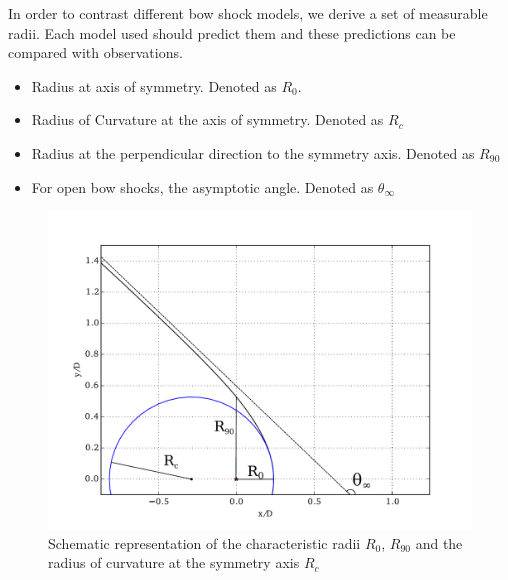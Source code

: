 In order to contrast different bow shock models, we  derive a set of measurable radii. Each model used should predict them and these predictions can be
compared with observations.

\begin{itemize}
\item Radius at axis of symmetry. Denoted as $R_0$. 
\item Radius of Curvature at the axis of symmetry. Denoted as $R_c$
\item Radius at the  perpendicular direction to the symmetry axis. Denoted as $R_{90}$
\item For open bow shocks, the asymptotic angle. Denoted as $\theta_\infty$
\end{itemize} 

\begin{figure}
\includegraphics[width=\linewidth]{ch-radii_ed2}
\caption{Schematic representation of the characteristic radii $R_0$, $R_{90}$ and the radius of curvature at the symmetry axis $R_c$}
\end{figure}



